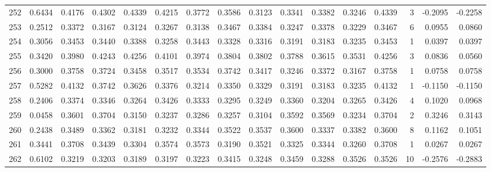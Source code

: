 \begin{tabular}{lrrrrrrrrrrrrrrr}
252 &      0.6434 &  0.4176 &  0.4302 &  0.4339 &  0.4215 &  0.3772 &  0.3586 &  0.3123 &  0.3341 &  0.3382 &   0.3246 &     0.4339 &      3 &                   -0.2095 &                    -0.2258 \\
253 &      0.2512 &  0.3372 &  0.3167 &  0.3124 &  0.3267 &  0.3138 &  0.3467 &  0.3384 &  0.3247 &  0.3378 &   0.3229 &     0.3467 &      6 &                    0.0955 &                     0.0860 \\
254 &      0.3056 &  0.3453 &  0.3440 &  0.3388 &  0.3258 &  0.3443 &  0.3328 &  0.3316 &  0.3191 &  0.3183 &   0.3235 &     0.3453 &      1 &                    0.0397 &                     0.0397 \\
255 &      0.3420 &  0.3980 &  0.4243 &  0.4256 &  0.4101 &  0.3974 &  0.3804 &  0.3802 &  0.3788 &  0.3615 &   0.3531 &     0.4256 &      3 &                    0.0836 &                     0.0560 \\
256 &      0.3000 &  0.3758 &  0.3724 &  0.3458 &  0.3517 &  0.3534 &  0.3742 &  0.3417 &  0.3246 &  0.3372 &   0.3167 &     0.3758 &      1 &                    0.0758 &                     0.0758 \\
257 &      0.5282 &  0.4132 &  0.3742 &  0.3626 &  0.3376 &  0.3214 &  0.3350 &  0.3329 &  0.3191 &  0.3183 &   0.3235 &     0.4132 &      1 &                   -0.1150 &                    -0.1150 \\
258 &      0.2406 &  0.3374 &  0.3346 &  0.3264 &  0.3426 &  0.3333 &  0.3295 &  0.3249 &  0.3360 &  0.3204 &   0.3265 &     0.3426 &      4 &                    0.1020 &                     0.0968 \\
259 &      0.0458 &  0.3601 &  0.3704 &  0.3150 &  0.3237 &  0.3286 &  0.3257 &  0.3104 &  0.3592 &  0.3569 &   0.3234 &     0.3704 &      2 &                    0.3246 &                     0.3143 \\
260 &      0.2438 &  0.3489 &  0.3362 &  0.3181 &  0.3232 &  0.3344 &  0.3522 &  0.3537 &  0.3600 &  0.3337 &   0.3382 &     0.3600 &      8 &                    0.1162 &                     0.1051 \\
261 &      0.3441 &  0.3708 &  0.3439 &  0.3304 &  0.3574 &  0.3573 &  0.3190 &  0.3521 &  0.3325 &  0.3344 &   0.3260 &     0.3708 &      1 &                    0.0267 &                     0.0267 \\
262 &      0.6102 &  0.3219 &  0.3203 &  0.3189 &  0.3197 &  0.3223 &  0.3415 &  0.3248 &  0.3459 &  0.3288 &   0.3526 &     0.3526 &     10 &                   -0.2576 &                    -0.2883 \\

\end{tabular}
